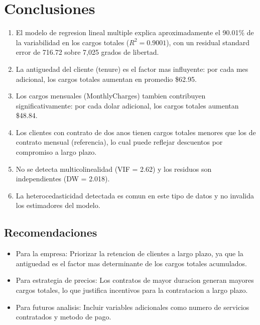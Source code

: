 \documentclass[12pt,a4paper]{article}
\begin{document}
\section{Conclusiones}

\begin{enumerate}[leftmargin=1.5cm]
    \item El modelo de regresion lineal multiple explica aproximadamente el 90.01\% de la variabilidad en los cargos totales ($R^2 = 0.9001$), con un residual standard error de 716.72 sobre 7,025 grados de libertad.
    
    \item La antiguedad del cliente (tenure) es el factor mas influyente: por cada mes adicional, los cargos totales aumentan en promedio \$62.95.
    
    \item Los cargos mensuales (MonthlyCharges) tambien contribuyen significativamente: por cada dolar adicional, los cargos totales aumentan \$48.84.
    
    \item Los clientes con contrato de dos anos tienen cargos totales menores que los de contrato mensual (referencia), lo cual puede reflejar descuentos por compromiso a largo plazo.
    
    \item No se detecta multicolinealidad (VIF = 2.62) y los residuos son independientes (DW = 2.018).
    
    \item La heterocedasticidad detectada es comun en este tipo de datos y no invalida los estimadores del modelo.
\end{enumerate}

\subsection{Recomendaciones}

\begin{itemize}[leftmargin=1.5cm]
    \item Para la empresa: Priorizar la retencion de clientes a largo plazo, ya que la antiguedad es el factor mas determinante de los cargos totales acumulados.
    
    \item Para estrategia de precios: Los contratos de mayor duracion generan mayores cargos totales, lo que justifica incentivos para la contratacion a largo plazo.
    
    \item Para futuros analisis: Incluir variables adicionales como numero de servicios contratados y metodo de pago.
\end{itemize}
\end{document}
